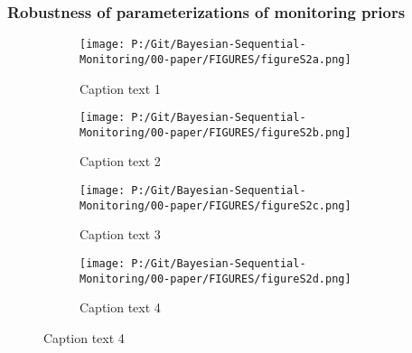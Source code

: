 \documentclass[12pt]{article}
\begin{document}
\subsubsection{Robustness of parameterizations of monitoring priors}
%
\begin{figure}
  \begin{subfigure}{6cm}
    \centering\texttt{[image: P:/Git/Bayesian-Sequential-Monitoring/00-paper/FIGURES/figureS2a.png]}
    \caption{Caption text 1}
  \end{subfigure}
  \begin{subfigure}{6cm}
    \centering\texttt{[image: P:/Git/Bayesian-Sequential-Monitoring/00-paper/FIGURES/figureS2b.png]}
    \caption{Caption text 2}
  \end{subfigure}
 
  \begin{subfigure}{6cm}
    \centering\texttt{[image: P:/Git/Bayesian-Sequential-Monitoring/00-paper/FIGURES/figureS2c.png]}
    \caption{Caption text 3}
  \end{subfigure}
  \begin{subfigure}{6cm}
    \centering\texttt{[image: P:/Git/Bayesian-Sequential-Monitoring/00-paper/FIGURES/figureS2d.png]}
    \caption{Caption text 4}
  \end{subfigure}
\end{figure}
 
\end{document}
